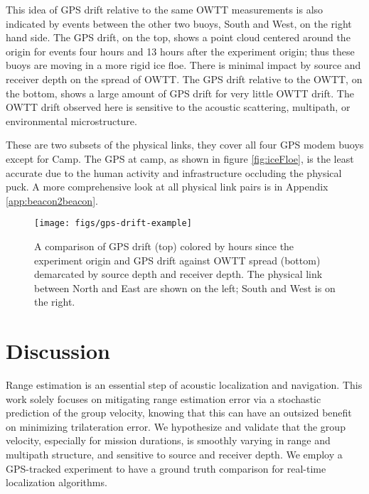 This idea of GPS drift relative to the same OWTT measurements is also indicated by events between the other two buoys, South and West, on the right hand side.
The GPS drift, on the top, shows a point cloud centered around the origin for events four hours and 13 hours after the experiment origin; thus these buoys are moving in a more rigid ice floe.
There is minimal impact by source and receiver depth on the spread of OWTT.
The GPS drift relative to the OWTT, on the bottom, shows a large amount of GPS drift for very little OWTT drift.
The OWTT drift observed here is sensitive to the acoustic scattering, multipath, or environmental microstructure.

These are two subsets of the physical links, they cover all four GPS modem buoys except for Camp.
The GPS at camp, as shown in figure \ref{fig:iceFloe}, is the least accurate due to the human activity and infrastructure occluding the physical puck.
A more comprehensive look at all physical link pairs is in Appendix \ref{app:beacon2beacon}.

\begin{figure}[h!]
	\centering
	\texttt{[image: figs/gps-drift-example]} 
	\caption[Examination of GPS and modem drift]{A comparison of GPS drift (top) colored by hours since the experiment origin and GPS drift against OWTT spread (bottom) demarcated by source depth and receiver depth. The physical link between North and East are shown on the left; South and West is on the right. }
	\label{fig:gps-drift-example}
\end{figure}

\section{\label{sec:4} Discussion}

Range estimation is an essential step of acoustic localization and navigation.
This work solely focuses on mitigating range estimation error via a stochastic prediction of the group velocity, knowing that this can have an outsized benefit on minimizing trilateration error.
We hypothesize and validate that the group velocity, especially for mission durations, is smoothly varying in range and multipath structure, and sensitive to source and receiver depth.
We employ a GPS-tracked experiment to have a ground truth comparison for real-time localization algorithms.

